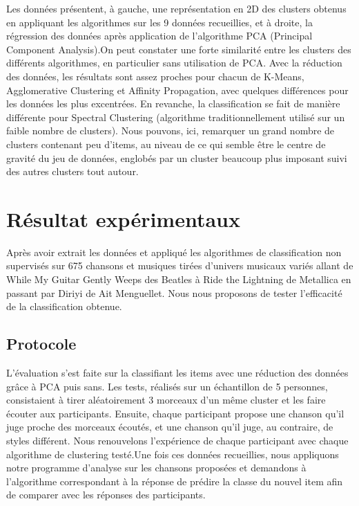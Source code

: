 \documentclass{ir}
\begin{document}
Les données présentent, à gauche, une représentation en 2D des clusters obtenus en appliquant les algorithmes 
sur les 9 données recueillies, et à droite, la régression des données après application de l’algorithme PCA 
(Principal Component Analysis).On peut constater une forte similarité entre les clusters des différents 
algorithmes, en particulier sans utilisation de PCA. Avec la réduction des données, les résultats sont assez 
proches pour chacun de K-Means, Agglomerative Clustering et Affinity Propagation, avec quelques différences pour
 les données les plus excentrées. En revanche, la classification se fait de manière différente pour Spectral 
 Clustering (algorithme traditionnellement utilisé sur un faible nombre de clusters). Nous pouvons, ici, 
 remarquer un grand nombre de clusters contenant peu d’items, au niveau de ce qui semble être le centre de 
 gravité du jeu de données, englobés par un cluster beaucoup plus imposant suivi des autres clusters tout autour.

\section{Résultat expérimentaux}
Après avoir extrait les données et appliqué les algorithmes de classification non supervisés sur 675 chansons et musiques tirées 
d’univers musicaux variés allant de While My Guitar Gently Weeps des Beatles à Ride the Lightning de Metallica 
en passant par Diriyi de Ait Menguellet. Nous nous proposons de tester l’efficacité de la classification obtenue.

\subsection{Protocole}
L’évaluation s’est faite sur la classifiant les items avec une réduction des données grâce à PCA puis sans. Les 
tests, réalisés sur un échantillon de 5 personnes, consistaient à tirer aléatoirement 3 morceaux d’un même 
cluster et les faire écouter aux participants. Ensuite, chaque participant propose une chanson qu’il juge proche 
des morceaux écoutés, et une chanson qu’il juge, au contraire, de styles différent. Nous renouvelons l’expérience 
de chaque participant avec chaque algorithme de clustering testé.Une fois ces données recueillies, nous 
appliquons notre programme d’analyse sur les chansons proposées et demandons à l’algorithme correspondant à la 
réponse de prédire la classe du nouvel item afin de comparer avec les réponses des participants.
\end{document}

